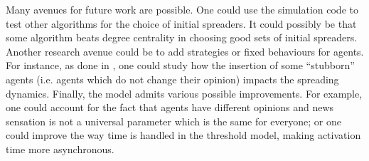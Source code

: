 \documentclass[10pt]{article}
\begin{document}
Many avenues for future work are possible. One could use the simulation code to test other algorithms for the choice of initial spreaders. It could possibly be that some algorithm beats degree centrality in choosing good sets of initial spreaders. Another research avenue could be to add strategies or fixed behaviours for agents. For instance, as done in \cite{singh2013threshold}, one could study how the insertion of some ``stubborn'' agents (i.e. agents which do not change their opinion) impacts the spreading dynamics. Finally, the model admits various possible improvements. 
For example, one could account for the fact that agents have different opinions and news sensation is not a universal parameter which is the same for everyone; or one could improve the way time is handled in the threshold model, making activation time more asynchronous. \\
\end{document}
